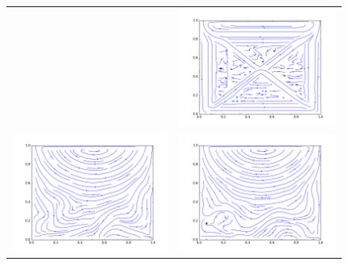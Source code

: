 \begin{figure}
\begin{tabulary}{\linewidth}{c c}
		&
		\includegraphics[width=\figwid]{figs/lid/bingham_100_bgk-filter_Bn100_Re100/sl_step-000050000}
		\\
		\includegraphics[width=\figwid]{figs/lid/bingham_100_mrt-8_Bn100_Re100/sl_step-000050000}
		&
		\includegraphics[width=\figwid]{figs/lid/bingham_100_mrt-filter_Bn100_Re100/sl_step-000050000}

\end{tabulary}
\end{figure}
